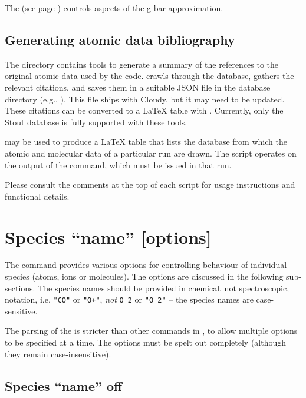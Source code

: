 The  (see page \pageref{sec:Setgbar}) controls aspects
of the g-bar approximation.

\subsection{Generating atomic data bibliography}
\label{sec:GeneratingAtomicDataBibliography}

\par
The  directory contains tools to generate a summary of 
the references to the original atomic data used by the code.
 crawls through the database, gathers the
relevant citations, and saves them in a suitable JSON file in the
database directory (e.g., ).
This file ships with Cloudy, but it may need to be updated.
These citations can be converted to a LaTeX table with
.
Currently, only the Stout database is fully supported with these tools.

\par
{} may be used to produce a LaTeX table that
lists the database from which the atomic and molecular data of a
particular run are drawn.
The script operates on the output of the 
command, which must be issued in that run.

\par
Please consult the comments at the top of each script for usage instructions
and functional details.


\section{Species ``name'' [options]}

The  command provides various options for
controlling behaviour of individual species (atoms, ions or
molecules).  The options are discussed in the following sub-sections.
The species names should be provided in chemical, not spectroscopic,
notation, i.e. \verb|"CO"| or \verb|"O+"|, {\em not}\/ \verb|O 2| or
\verb|"O 2"| -- the species names are case-sensitive.

The parsing of the  is stricter than other commands
in \Cloudy, to allow multiple options to be specified at a time.  The
options must be spelt out completely (although they remain
case-insensitive).

\subsection{Species ``name'' off}

